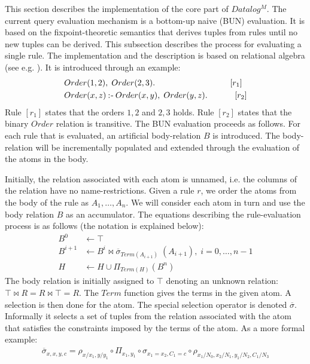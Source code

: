 \newcommand{\sigmatwo}{\overline{\sigma}}
This section describes the implementation of the core part of $Datalog^{M}$. The current query evaluation mechanism is a bottom-up naive (BUN) \cite{Green:2013:DRQ:2688167.2688168} evaluation. It is based on the fixpoint-theoretic semantics that derives tuples from rules until no new tuples can be derived. This subsection describes the process for evaluating a single rule. The implementation and the description is based on relational algebra (see e.g. \cite{Abiteboul:1995:FDL:551350}). It is introduced through an example:
\begin{align*}
&Order(1, 2),\; Order(2, 3). \quad\quad\quad\quad\quad\quad\quad\quad\quad[r_1]\\
&Order(x, z) \mathbin{:\hspace{-0.5ex}\textsf{-}} Order(x, y),\; Order(y, z). \;\quad\quad\quad[r_2]
\end{align*}
\noindent
Rule $[r_1]$ states that the orders $1, 2$ and $2, 3$ holds. Rule $[r_2]$ states that the binary $Order$ relation is transitive. The BUN evaluation proceeds as follows. For each rule that is evaluated, an artificial body-relation $B$ is introduced. The body-relation will be incrementally populated and extended through the evaluation of the atoms in the body. 

Initially, the relation associated with each atom is unnamed, i.e. the columns of the relation have no name-restrictions. Given a rule $r$, we order the atoms from the body of the rule as $A_1, \ldots, A_n$. We will consider each atom in turn and use the body relation $B$ as an accumulator. The equations describing the rule-evaluation process is as follows (the notation is explained below):
\begin{align*}
B^{0} &\leftarrow \top \\
B^{i + 1} &\leftarrow B^{i} \bowtie \sigmatwo_{Term(A_{i + 1})}\;(A_{i + 1}), \; i = 0, \ldots, n - 1\\
H & \leftarrow H \cup \Pi_{Term(H)}(B^n)
\end{align*}
\noindent
The body relation is initially assigned to $\top$ denoting an unknown relation: $\top \bowtie R = R \bowtie \top = R$. The $Term$ function gives the terms in the given atom. A selection is then done for the atom. The special selection operator is denoted $\sigmatwo$. Informally it selects a set of tuples from the relation associated with the atom that satisfies the constraints imposed by the terms of the atom. As a more formal example:
\begin{align*}
\sigmatwo_{x,x,y,c} = \rho_{x/x_1, y/y_1} \circ \Pi_{x_1, y_1} \circ \sigma_{x_1 = x_2, C_1 = c} \circ \rho_{x_1/N_0, x_2/N_1, y_1/N_2, C_1/N_3}
\end{align*}


